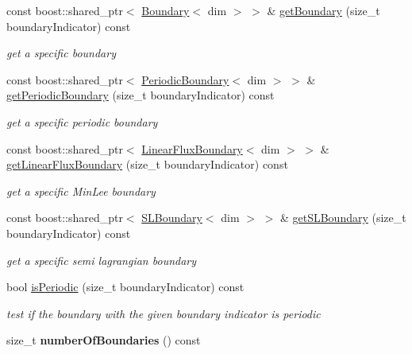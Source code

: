 \begin{DoxyCompactItemize}
\item 
const boost::shared\_\-ptr$<$ \hyperlink{classnatrium_1_1Boundary}{Boundary}$<$ dim $>$ $>$ \& \hyperlink{classnatrium_1_1BoundaryCollection_a44816fa48b8100fb37b8ad7491c2cc6c}{getBoundary} (size\_\-t boundaryIndicator) const 
\begin{DoxyCompactList}\small\item\em get a specific boundary \item\end{DoxyCompactList}\item 
const boost::shared\_\-ptr$<$ \hyperlink{classnatrium_1_1PeriodicBoundary}{PeriodicBoundary}$<$ dim $>$ $>$ \& \hyperlink{classnatrium_1_1BoundaryCollection_aea0ba68a319b3ec0f3774ba814e18217}{getPeriodicBoundary} (size\_\-t boundaryIndicator) const 
\begin{DoxyCompactList}\small\item\em get a specific periodic boundary \item\end{DoxyCompactList}\item 
const boost::shared\_\-ptr$<$ \hyperlink{classnatrium_1_1LinearFluxBoundary}{LinearFluxBoundary}$<$ dim $>$ $>$ \& \hyperlink{classnatrium_1_1BoundaryCollection_a7961dc115c0a8cd29fa5cf6f553aa78f}{getLinearFluxBoundary} (size\_\-t boundaryIndicator) const 
\begin{DoxyCompactList}\small\item\em get a specific MinLee boundary \item\end{DoxyCompactList}\item 
const boost::shared\_\-ptr$<$ \hyperlink{classnatrium_1_1SLBoundary}{SLBoundary}$<$ dim $>$ $>$ \& \hyperlink{classnatrium_1_1BoundaryCollection_ab914df04ecc518f42f8a61287f2f8b3c}{getSLBoundary} (size\_\-t boundaryIndicator) const 
\begin{DoxyCompactList}\small\item\em get a specific semi lagrangian boundary \item\end{DoxyCompactList}\item 
\hypertarget{classnatrium_1_1BoundaryCollection_aec4a9de4aaccaa7a49e5308bf9812c66}{
bool \hyperlink{classnatrium_1_1BoundaryCollection_aec4a9de4aaccaa7a49e5308bf9812c66}{isPeriodic} (size\_\-t boundaryIndicator) const }
\label{classnatrium_1_1BoundaryCollection_aec4a9de4aaccaa7a49e5308bf9812c66}

\begin{DoxyCompactList}\small\item\em test if the boundary with the given boundary indicator is periodic \item\end{DoxyCompactList}\item 
\hypertarget{classnatrium_1_1BoundaryCollection_ad9dbba7ffccaa31ee79cace73197148e}{
size\_\-t {\bfseries numberOfBoundaries} () const }
\label{classnatrium_1_1BoundaryCollection_ad9dbba7ffccaa31ee79cace73197148e}


\end{DoxyCompactItemize}
